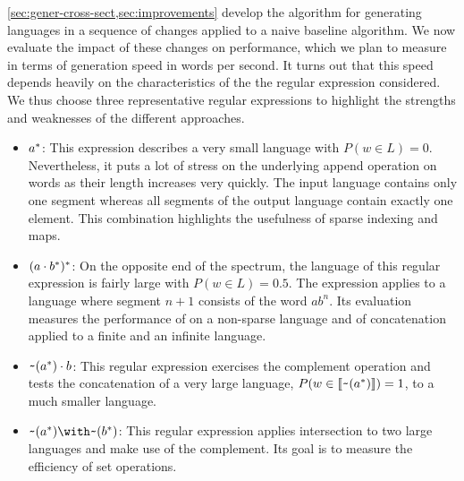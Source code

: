 \cref{sec:gener-cross-sect,sec:improvements} develop the
algorithm for generating languages in a sequence of changes applied to
a naive baseline algorithm. We now evaluate the impact of these
changes on performance, which we plan to measure in terms of
generation speed in words per second. It turns out that this speed
depends heavily on the characteristics of the the regular expression
considered. We thus choose three representative regular expressions to highlight the
strengths and weaknesses of the different approaches.
\begin{itemize}
\item $a^*$: This expression describes a very small language with $P (w\in L) = 0$.
  Nevertheless, it puts a lot of stress on the underlying
  append operation on words as their length increases very quickly.
  The input language contains only one segment whereas all segments of
  the output language contain exactly one element. This combination
  highlights the usefulness of sparse indexing and maps.
\item $(a \cdot{b^*})^*$: On the opposite end of the
  spectrum, the language of this regular expression is fairly large
  with $P (w\in L)=0.5$. The expression applies  to a
  language where segment $n+1$ consists of the word $ab^n$. Its
  evaluation measures the performance of  on a non-sparse
  language and of {concatenation} applied to a finite and an infinite
  language.
\item $\texttt{\textasciitilde}{(a^*)} \cdot{b}$: This regular
  expression exercises the complement operation and tests the
  concatenation of a very large language, 
  $P (w\in \llbracket\texttt{\textasciitilde}{(a^*)}\rrbracket) = 1$, to a much smaller
  language.
\item $\Rintersect{\Rcomplement{(\Rstar{a})}}{\Rcomplement{(\Rstar{b})}}$:
  This regular expression applies {intersection} to two large languages
  and make use of the complement. Its goal is to measure the efficiency
  of set operations.
\end{itemize}

